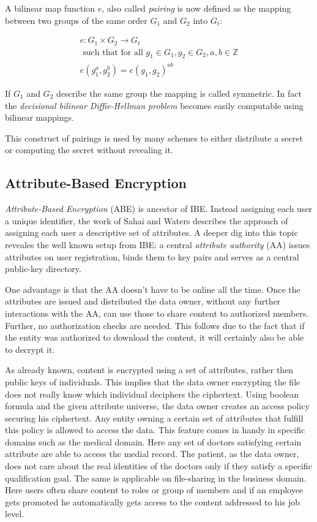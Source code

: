 A bilinear map function $e$, also called \textit{pairing} is now defined as the mapping between two groups of the same order $G_1$ and $G_2$ into $G_t$:

\begin{gather*}
 e : G_1 \times G_2 \rightarrow G_t \\
\text{ such that for all } g_1 \in G_1, g_2 \in G_2, a, b \in \mathbb{Z} \\
e(g_1^a, g_2^b) = e(g_1, g_2)^{ab} 
\end{gather*}

If $G_1$ and $G_2$ describe the same group the mapping is called symmetric. In fact the \textit{decisional bilinear Diffie-Hellman problem} becomes easily computable using bilinear mappings. \cite{bethencourt2015intro}

This construct of pairings is used by many schemes to either distribute a secret or computing the secret without revealing it.

\subsection{Attribute-Based Encryption}
\textit{Attribute-Based Encryption} (\ac{ABE}) is ancestor of IBE. Instead assigning each user a unique identifier, the work of Sahai and Waters \cite{sahai2005fuzzy} describes the approach of assigning each user a descriptive set of attributes. A deeper dig into this topic reveales the well known setup from \ac{IBE}: a central \textit{attribute authority} (\ac{AA}) issues attributes on user registration, binds them to key pairs and serves as a central public-key directory. 

One advantage is that the \ac{AA} doesn't have to be online all the time. Once the attributes are issued and distributed the data owner, without any further interactions with the \ac{AA}, can use those to share content to authorized members. Further, no authorization checks are needed. This follows due to the fact that if the entity was authorized to download the content, it will certainly also be able to decrypt it. 

As already known, content is encrypted using a set of attributes, rather then public keys of individuals. This implies that the data owner encrypting the file does not really know which individual deciphers the ciphertext. Using boolean formula and the given attribute universe, the data owner creates an access policy securing his ciphertext. Any entity owning a certain set of attributes that fulfill this policy is allowed to access the data. This feature comes in handy in specific domains such as the medical domain. Here any set of doctors satisfying certain attribute are able to access the medial record. The patient, as the data owner, does not care about the real identities of the doctors only if they satisfy a specific qualification goal. The same is applicable on file-sharing in the business domain. Here users often share content to roles or group of members and if an employee gets promoted he automatically gets access to the content addressed to his job level. 

